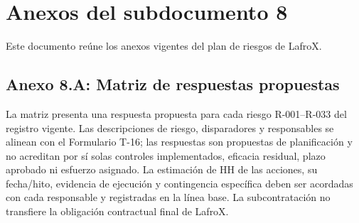 \documentclass[carta,firma,sinnotas]{lafrox}
\begin{document}
\portadalafrox
\preliminareslafrox
\setcounter{chapter}{7}

\chapter{Anexos del subdocumento 8}

Este documento reúne los anexos vigentes del plan de riesgos de LafroX.

\section{Anexo 8.A: Matriz de respuestas propuestas}

La matriz presenta una respuesta propuesta para cada riesgo R-001--R-033 del registro vigente. Las descripciones de riesgo, disparadores y responsables se alinean con el Formulario T-16; las respuestas son propuestas de planificación y no acreditan por sí solas controles implementados, eficacia residual, plazo aprobado ni esfuerzo asignado. La estimación de HH de las acciones, su fecha/hito, evidencia de ejecución y contingencia específica deben ser acordadas con cada responsable y registradas en la línea base. La subcontratación no transfiere la obligación contractual final de LafroX.
\end{document}
